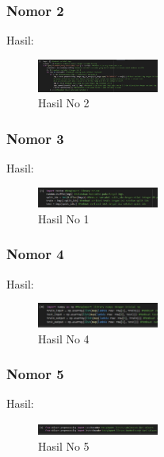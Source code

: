 \subsubsection{Nomor 2}
\hfill\break

Hasil:
\begin{figure}[H]
\centering
	\includegraphics[width=4cm]{figures/1174066/7/no2.jpg}
	\caption{Hasil No 2}
\end{figure}

\subsubsection{Nomor 3}
\hfill\break

Hasil:
\begin{figure}[H]
\centering
	\includegraphics[width=4cm]{figures/1174066/7/no3.jpg}
	\caption{Hasil No 1}
\end{figure}

\subsubsection{Nomor 4}
\hfill\break

Hasil:
\begin{figure}[H]
\centering
	\includegraphics[width=4cm]{figures/1174066/7/no4.jpg}
	\caption{Hasil No 4}
\end{figure}

\subsubsection{Nomor 5}
\hfill\break

Hasil:
\begin{figure}[H]
\centering
	\includegraphics[width=4cm]{figures/1174066/7/no5.jpg}
	\caption{Hasil No 5}
\end{figure}

